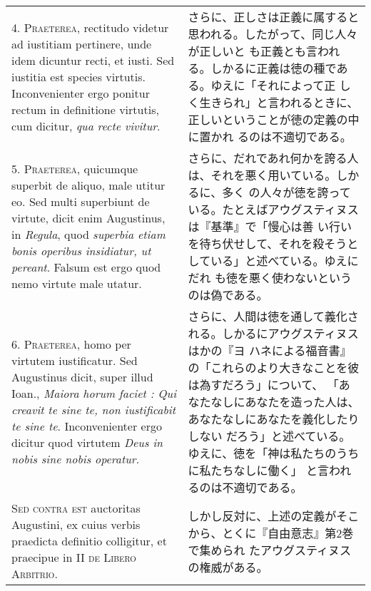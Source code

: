\documentclass[10pt]{jsarticle}
\begin{document}
\begin{longtable}{p{21em}p{21em}}
4. {\scshape Praeterea}, rectitudo videtur ad iustitiam pertinere,
unde idem dicuntur recti, et iusti. Sed iustitia est species
virtutis. Inconvenienter ergo ponitur rectum in definitione virtutis,
cum dicitur, {\itshape qua recte vivitur}.

&

さらに、正しさは正義に属すると思われる。したがって、同じ人々が正しいと
も正義とも言われる。しかるに正義は徳の種である。ゆえに「それによって正
しく生きられ」と言われるときに、正しいということが徳の定義の中に置かれ
るのは不適切である。

\\

5. {\scshape Praeterea}, quicumque superbit de aliquo, male utitur
eo. Sed multi superbiunt de virtute, dicit enim Augustinus, in
{\itshape Regula}, quod {\itshape superbia etiam bonis operibus
insidiatur, ut pereant}. Falsum est ergo quod nemo virtute male
utatur.

&

さらに、だれであれ何かを誇る人は、それを悪く用いている。しかるに、多く
の人々が徳を誇っている。たとえばアウグスティヌスは『基準』で「慢心は善
い行いを待ち伏せして、それを殺そうとしている」と述べている。ゆえにだれ
も徳を悪く使わないというのは偽である。

\\

6. {\scshape Praeterea}, homo per virtutem iustificatur. Sed
Augustinus dicit, super illud Ioan., {\itshape Maiora horum faciet :
Qui creavit te sine te, non iustificabit te sine te}. Inconvenienter
ergo dicitur quod virtutem {\itshape Deus in nobis sine nobis
operatur}.

&

さらに、人間は徳を通して義化される。しかるにアウグスティヌスはかの『ヨ
ハネによる福音書』の「これらのより大きなことを彼は為すだろう」について、
「あなたなしにあなたを造った人は、あなたなしにあなたを義化したりしない
だろう」と述べている。ゆえに、徳を「神は私たちのうちに私たちなしに働く」
と言われるのは不適切である。

\\

{\scshape Sed contra est} auctoritas Augustini, ex cuius verbis
praedicta definitio colligitur, et praecipue in II {\scshape de Libero
Arbitrio}.

&

しかし反対に、上述の定義がそこから、とくに『自由意志』第2巻で集められ
たアウグスティヌスの権威がある。

\\


\end{longtable}
\end{document}
